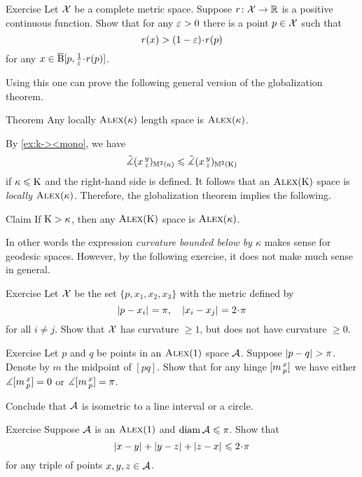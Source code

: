 \begin{thm}{Exercise}\label{ex:alm-min}
Let $\mathcal{X}$ be a complete metric space.
Suppose $r\colon\mathcal{X}\to \mathbb{R}$ is a positive continuous function.
Show that for any $\varepsilon>0$ there is a point $p\in \mathcal{X}$ such that 
\[r(x)> (1-\eps)\cdot r(p)\] 
for any $x\in \cBall[p,\tfrac{1}{\eps}\cdot r(p)]$.

\end{thm}

Using this one can prove the following general version of the globalization theorem.

\begin{thm}{Theorem}\label{thm:globalization+}
Any locally $\textsc{Alex}(\kappa)$ length space is $\textsc{Alex}(\kappa)$.
\end{thm}

By \ref{ex:k-><mono}, we have
\[\tilde\measuredangle(x\,{}^{y}_{z})_{\mathbb{M}^2(\kappa)}\leqslant \tilde\measuredangle(x\,{}^{y}_{z})_{\mathbb{M}^2(\mathrm{K})}\]
if $\kappa\leqslant \mathrm{K}$ and the right-hand side is defined.
It follows that an $\textsc{Alex}(\mathrm{K})$ space is \textit{locally} $\textsc{Alex}(\kappa)$.
Therefore, the globalization theorem implies the following.

\begin{thm}{Claim}\label{clm:K>k}
If $\mathrm{K}>\kappa$, then any $\textsc{Alex}(\mathrm{K})$ space is $\textsc{Alex}(\kappa)$.
\end{thm}

In other words the expression \textit{curvature bounded below by $\kappa$} makes sense for geodesic spaces.
However, by the following exercise, it does not make much sense in general.

\begin{thm}{Exercise}\label{ex:CBB(1)notitCBB(0)}
Let $\mathcal{X}$ be the set $\{p,x_1,x_2,x_3\}$ with the metric defined by
\[\dist{p}{x_i}{}=\pi,\quad\dist{x_i}{x_j}{}=2\cdot\pi\]
for all $i\ne j$.
Show that $\mathcal{X}$ has curvature $\ge 1$, but does not have curvature $\ge 0$.
\end{thm}

\begin{thm}{Exercise}\label{ex:RisCBB(1)}
Let $p$ and $q$ be points in an $\textsc{Alex}(1)$ space $\mathcal{A}$.
Suppose $|{p}-{q}|_{}^{{}}>\pi$.
Denote by $m$ the midpoint of $[pq]$.
Show that for any hinge $[m\,{}^{x}_{p}]$ we have
either $\measuredangle[m\,{}^{x}_{p}]=0$ or $\measuredangle[m\,{}^{x}_{p}]=\pi$.

Conclude that $\mathcal{A}$ is isometric to a line interval or a circle.

\end{thm}

\begin{thm}{Exercise}\label{ex:perim-k>0}
Suppose  
$\mathcal{A}$ is an $\textsc{Alex}(1)$
and $\operatorname{\rm diam}\nolimits \mathcal{A}\leqslant \pi$.
Show that 
\[\dist{x}{y}{}+\dist{y}{z}{}+\dist{z}{x}{}\le 2\cdot\pi\]
for any triple of points $x,y,z\in \mathcal{A}$.
\end{thm}


